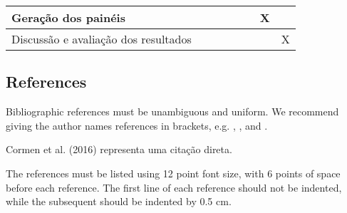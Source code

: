 \begin{table}[!htb]
{\begin{tabular}{l|ccccccc|}
\multicolumn{1}{|l|}{Geração dos painéis}           & \multicolumn{1}{c|}{}    & \multicolumn{1}{c|}{}    & \multicolumn{1}{c|}{}    & \multicolumn{1}{c|}{}    & \multicolumn{1}{c|}{}    & \multicolumn{1}{c|}{X}   &               \\ \hline
\multicolumn{1}{|l|}{Discussão e avaliação dos resultados}                      & \multicolumn{1}{c|}{}    & \multicolumn{1}{c|}{}    & \multicolumn{1}{c|}{}    & \multicolumn{1}{c|}{}    & \multicolumn{1}{c|}{}    & \multicolumn{1}{c|}{}    & X             \\ \hline
\end{tabular}%
}
\end{table} 



\subsection{References}

Bibliographic references must be unambiguous and uniform.  We recommend giving
the author names references in brackets, e.g. \cite{knuth:84},
\cite{boulic:91}, and \cite{smith:99}.

Cormen et al. (2016)\nocite{cormen2002algoritmos} representa uma citação direta.



The references must be listed using 12 point font size, with 6 points of space
before each reference. The first line of each reference should not be
indented, while the subsequent should be indented by 0.5 cm.